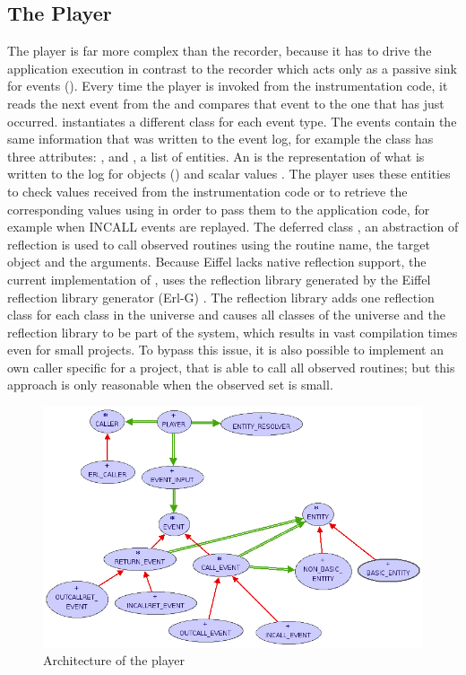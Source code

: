 \subsection{The Player}
The player is far more complex than the recorder, because it has to drive the application execution in contrast to the recorder which acts only as a passive sink for events (). 
Every time the player is invoked from the instrumentation code, it reads the next event from the  and compares that event to the one that has just occurred.  instantiates a different class for each event type. The events contain the same information that was written to the event log, for example the class  has three attributes: ,  and , a list of entities. An  is the representation of what is written to the log for objects () and scalar values . The player uses these entities to check values received from the instrumentation code or to retrieve the corresponding values using  in order to pass them to the application code, for example when INCALL events are replayed. The deferred class , an abstraction of reflection is used to call observed routines using the routine name, the target object and the arguments. Because Eiffel lacks native reflection support, the current implementation of ,  uses the reflection library generated by the Eiffel reflection library generator (Erl-G) \cite{erlg}. The reflection library adds one reflection class for each class in the universe and causes all classes of the universe and the reflection library to be part of the system, which results in vast compilation times even for small projects. To bypass this issue, it is also possible to implement an own caller specific for a project, that is able to call all observed routines; but this approach is only reasonable when the observed set is small.

\begin{figure}[ht]
  \centering
  \includegraphics[width=1\textwidth]{illustrations/implementation_player.png}
  \caption{Architecture of the player}
  \label{fig:implementation_player}
\end{figure}


